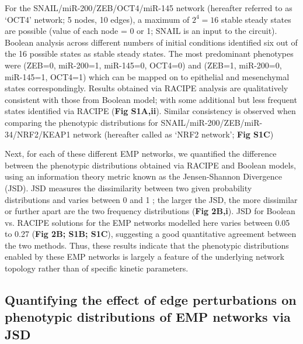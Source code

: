 \documentclass[preprint,review,12pt]{elsarticle}
\begin{document}
	For the SNAIL/miR-200/ZEB/OCT4/miR-145 network (hereafter referred to as ‘OCT4’ network; 5 nodes, 10 edges), a maximum of $2^4=16$ stable steady states are possible (value of each node = 0 or 1; SNAIL is an input to the circuit). Boolean analysis across different numbers of initial conditions identified six out of the 16 possible states as stable steady states. The most predominant phenotypes were (ZEB=0, miR-200=1, miR-145=0, OCT4=0) and (ZEB=1, miR-200=0, miR-145=1, OCT4=1) which can be mapped on to epithelial and mesenchymal states correspondingly. Results obtained via RACIPE analysis are qualitatively consistent with those from Boolean model; with some additional but less frequent states identified via RACIPE (\textbf{Fig S1A,ii}). Similar consistency is observed when comparing the phenotypic distributions for SNAIL/miR-200/ZEB/miR-34/NRF2/KEAP1 network (hereafter called as ‘NRF2 network’; \textbf{Fig S1C}) 
	
	Next, for each of these different EMP networks, we quantified the difference between the phenotypic distributions obtained via RACIPE and Boolean models, using an information theory metric known as the Jensen-Shannon Divergence (JSD). JSD measures the dissimilarity between two given probability distributions and varies between 0 and 1 \cite{Lin1991}; the larger the JSD, the more dissimilar or further apart are the two frequency distributions (\textbf{Fig 2B,i}).  JSD for Boolean vs. RACIPE solutions for the EMP networks modelled here varies between 0.05 to 0.27 (\textbf{Fig 2B; S1B; S1C}), suggesting a good quantitative agreement between the two methods. Thus, these results indicate that the phenotypic distributions enabled by these EMP networks is largely a feature of the underlying network topology rather than of specific kinetic parameters.
	
	
	\subsection{Quantifying the effect of edge perturbations on phenotypic distributions of EMP networks via JSD}
	
\end{document}
